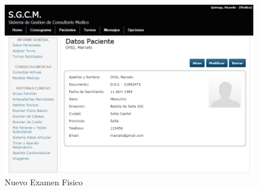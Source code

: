 \begin{figure}[H]
    \centering
    \includegraphics[scale=0.5]{resourse/datos-paciente-m.png}
    \caption{Nuevo Examen Fisico}
    \label{fig:618}
\end{figure}

